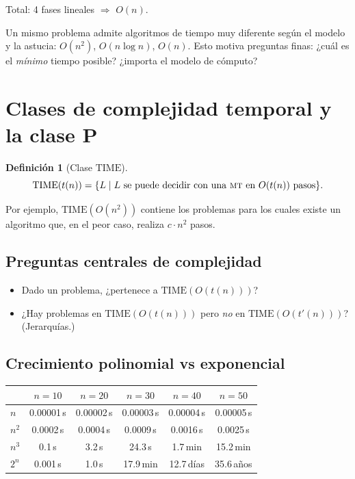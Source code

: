 \documentclass[11pt,a4paper]{article}
\theoremstyle{definicion}
\newtheorem{definicion}{Definici\'on}[section]
\newcommand{\MT}{\textsc{mt}}
\newcommand{\TIME}{\mathrm{TIME}}
\begin{document}
Total: 4 fases lineales $\Rightarrow$ \textbf{$O(n)$}.

\begin{idea}
Un mismo problema admite algoritmos de tiempo muy diferente seg\'un el modelo y la astucia: $O(n^2)$, $O(n \log n)$, $O(n)$. Esto motiva preguntas finas: ¿cu\'al es el \emph{m\'inimo} tiempo posible? ¿importa el modelo de c\'omputo?
\end{idea}

\section{Clases de complejidad temporal y la clase P}

\begin{definicion}[Clase $\TIME$]
\[
\TIME(t(n)) = \{ L \mid L \text{ se puede decidir con una \MT\ en } O(t(n)) \text{ pasos}\}.
\]
\end{definicion}

Por ejemplo, $\TIME(O(n^2))$ contiene los problemas para los cuales existe un algoritmo que, en el peor caso, realiza $c \cdot n^2$ pasos.

\subsection{Preguntas centrales de complejidad}

\begin{itemize}
    \item Dado un problema, ¿pertenece a $\TIME(O(t(n)))$?
    \item ¿Hay problemas en $\TIME(O(t(n)))$ pero \emph{no} en $\TIME(O(t'(n)))$? (Jerarqu\'ias.)
\end{itemize}

\subsection{Crecimiento polinomial vs exponencial}

\begin{center}
\begin{tabular}{lccccc}
\toprule
 & $n=10$ & $n=20$ & $n=30$ & $n=40$ & $n=50$ \\
\midrule
$n$    & 0.00001\,s & 0.00002\,s & 0.00003\,s & 0.00004\,s & 0.00005\,s \\
$n^2$  & 0.0002\,s  & 0.0004\,s  & 0.0009\,s  & 0.0016\,s  & 0.0025\,s  \\
$n^3$  & 0.1\,s     & 3.2\,s     & 24.3\,s    & 1.7\,min   & 15.2\,min  \\
$2^n$  & 0.001\,s   & 1.0\,s     & 17.9\,min  & 12.7\,d\'ias & 35.6\,a\~nos \\
\bottomrule
\end{tabular}
\end{center}
\end{document}

